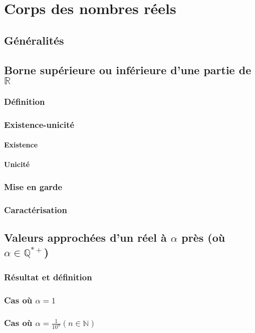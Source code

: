 \documentclass[12pt,a4paper,french]{book}
\begin{document}
	
	
\chapter{Corps des nombres réels}
	\section{Généralités}
	\section{Borne supérieure ou inférieure d'une partie de $\mathbb{R}$}
		\subsection{Définition}
		\subsection{Existence-unicité}
			\subsubsection{Existence}
			\subsubsection{Unicité}
		\subsection{Mise en garde}
		\subsection{Caractérisation}
	\section{Valeurs approchées d'un réel à $\alpha$ près (où $\alpha \in \mathbb{Q}^{\ast+}$)}
		\subsection{Résultat et définition}
		\subsection{Cas où $\alpha = 1$}
		\subsection{Cas où $\alpha = \frac{1}{10^{n}} (n \in \mathbb{N})$}
\end{document}
